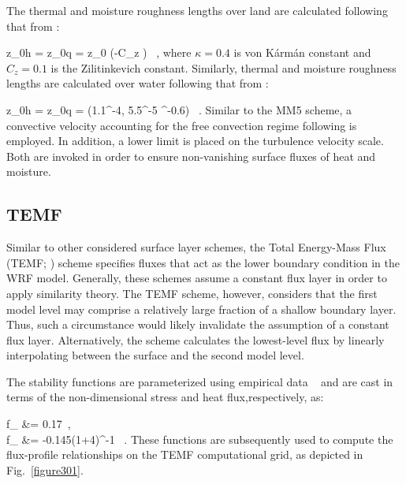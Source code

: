 The thermal and moisture roughness lengths over land are calculated following that from  \citet{Zilit}:

\be
z_{0h} = z_{0q} = z_0 \exp \left(-\kappa C_z \right) \, , \label{equation331}
\ee
\noindent
 where $\kappa = 0.4$ is von K\'{a}rm\'{a}n constant and $C_z = 0.1$ is the Zilitinkevich constant. Similarly, thermal and moisture roughness lengths are calculated over water following that from  \citet{Fairall2003}:

\be
z_{0h} = z_{0q} = \min \left(1.1^{-4}, 5.5^{-5} ^{-0.6}\right) \, . \label{332}
\ee
\noindent
 Similar to the MM5 scheme, a convective velocity accounting for the free convection regime following  \citet{Beljaars} is employed. In addition, a lower limit is placed on the turbulence velocity scale. Both are invoked in order to ensure non-vanishing surface fluxes of heat and moisture. 

\subsection{TEMF}
\label{sl-temf-354}

Similar to other considered surface layer schemes, the Total Energy-Mass Flux (TEMF; \citealt{Angevine2010}) scheme specifies fluxes that act as the lower boundary condition in the WRF model. Generally, these schemes assume a constant flux layer in order to apply similarity theory. The TEMF scheme, however, considers that the first model level may comprise a relatively large fraction of a shallow boundary layer. Thus, such a circumstance would likely invalidate the assumption of a constant flux layer. Alternatively, the scheme calculates the lowest-level flux by linearly interpolating between the surface and the second model level. 

The stability functions are parameterized using empirical data ~\citep{MS2007} and are cast in terms of the non-dimensional stress and heat flux,respectively, as:

\bse \label{equation333}
\bal
f_{\tau} &= 0.17 \, , \label{equation333a} \\
f_{\theta} &= -0.145\left(1+4\right)^{-1} \, .\label{equation333b}
\eal
\ese
\noindent
These functions are subsequently used to compute the flux-profile relationships on the TEMF computational grid, as depicted in Fig.~\ref{figure301}.


